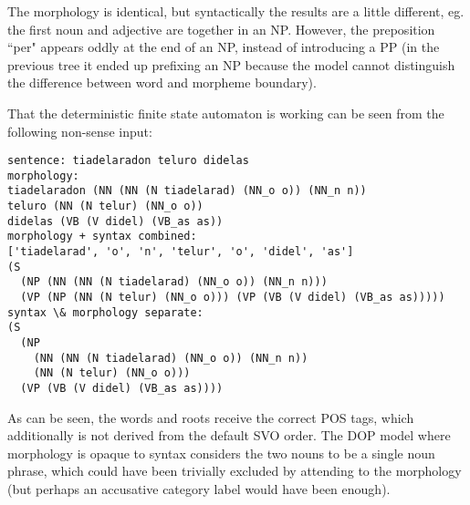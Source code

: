\documentclass[10pt,a4paper]{article}
\begin{document}
The morphology is identical, but syntactically the results are a little
different, eg. the first noun and adjective are together in an NP. However,
the preposition ``per" appears oddly at the end of an NP, instead of
introducing a PP (in the previous tree it ended up prefixing an NP because the
model cannot distinguish the difference between word and morpheme boundary).

That the deterministic finite state automaton is working can be seen from
the following non-sense input:

\begin{verbatim}
sentence: tiadelaradon teluro didelas
morphology:
tiadelaradon (NN (NN (N tiadelarad) (NN_o o)) (NN_n n))
teluro (NN (N telur) (NN_o o))
didelas (VB (V didel) (VB_as as))
morphology + syntax combined:
['tiadelarad', 'o', 'n', 'telur', 'o', 'didel', 'as']
(S
  (NP (NN (NN (N tiadelarad) (NN_o o)) (NN_n n)))
  (VP (NP (NN (N telur) (NN_o o))) (VP (VB (V didel) (VB_as as)))))
syntax \& morphology separate:
(S
  (NP
    (NN (NN (N tiadelarad) (NN_o o)) (NN_n n))
    (NN (N telur) (NN_o o)))
  (VP (VB (V didel) (VB_as as))))
\end{verbatim}

As can be seen, the words and roots receive the correct POS tags, which
additionally is not derived from the default SVO order.
The DOP model where morphology is opaque to syntax considers the two nouns
to be a single noun phrase, which could have been trivially excluded by
attending to the morphology (but perhaps an accusative category label would
have been enough).

\begin{comment}
\subsection{Todo}

\item parse bitpar chart output into NLTK (currently only most probable derivation; 
  we need $n$ most probable parses and maybe shortest derivation, SL-DOP etc.)
\item use Reta Vortaro / ergane Esperanto dictionary and root lists 
  to induce segmentation / morphology model in a semi-supervised fashion.
\item check morphology coverage against vocabulary of Monato treebank
\item distinguish between morpheme and word boundaries (how?).
  possibly by having a trailing space as part of a morphological analysis 
  (but: this should not block inflection for plurality and accusative (+j and +n respectively).
\item finish report (convert wiki to latex?). evaluation \& conclusion.
  write about Dasgupta (2008) \& is there work on DOP + dependencies? 
  mention DLT as older exemplar model.
\item look at DOP* / U-DOP
\end{comment}
\end{document}
